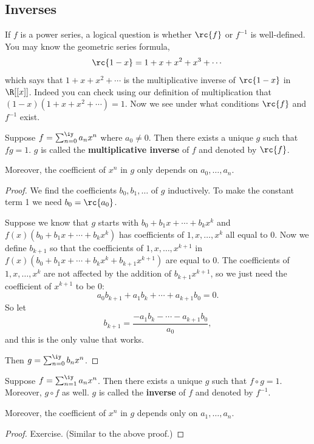 \subsection{Inverses}
If $f$ is a power series, a logical question is whether $\rc{f}$ or $f^{-1}$ is well-defined. You may know the geometric series formula,
\[
\rc{1-x}=1+x+x^2+x^3+\cdots
\]
which says that $1+x+x^2+\cdots $ is the multiplicative inverse of $\rc{1-x}$ in $\R[[x]]$. Indeed you can check using our definition of multiplication that $(1-x)(1+x+x^2+\cdots )=1$. Now we see under what conditions $\rc{f}$ and $f^{-1}$ exist.
\begin{thm}\label{multinv}
Suppose $f=\sum_{n=0}^{\iy}a_n x^n$ where $a_0\neq 0$. Then there exists a unique $g$ such that $fg=1$. $g$ is called the \textbf{multiplicative inverse} of $f$ and denoted by $\rc{f}$.

Moreover, the coefficient of $x^n$ in $g$ only depends on $a_0,\ldots, a_n$.
\end{thm}
\begin{proof}
We find the coefficients $b_0,b_1,\ldots$ of $g$ inductively. To make the constant term 1 we need $b_0=\rc{a_0}$.

Suppose we know that $g$ starts with $b_0+b_1x+\cdots+b_kx^k$ and $f(x)(b_0+b_1x+\cdots+b_kx^k)$ has coefficients of $1,x,\ldots, x^k$ all equal to 0. Now we define $b_{k+1}$ so that the coefficients of $1,x,\ldots, x^{k+1}$ in $f(x)(b_0+b_1x+\cdots+b_kx^k+b_{k+1}x^{k+1})$ are equal to 0. The coefficients of $1,x,\ldots, x^k$ are not affected by the addition of $b_{k+1}x^{k+1}$, so we just need the coefficient of $x^{k+1}$ to be 0:
\[
a_0b_{k+1}+a_1b_k+\cdots +a_{k+1}b_0=0.
\]
So let
\[
b_{k+1}=\frac{-a_1b_k-\cdots -a_{k+1}b_0}{a_0},
\]
and this is the only value that works.

Then $g=\sum_{n=0}^{\iy} b_n x^n$.
\end{proof}
\begin{thm}
Suppose $f=\sum_{n=1}^{\iy} a_nx^n$. Then there exists a unique $g$ such that $f\circ g=1$. Moreover, $g\circ f$ as well. $g$ is called the  %
\textbf{inverse} of $f$ and denoted by $f^{-1}$.

Moreover, the coefficient of $x^n$ in $g$ depends only on $a_1,\ldots, a_n$.
\end{thm}
\begin{proof}
Exercise. (Similar to the above proof.)
\end{proof}

